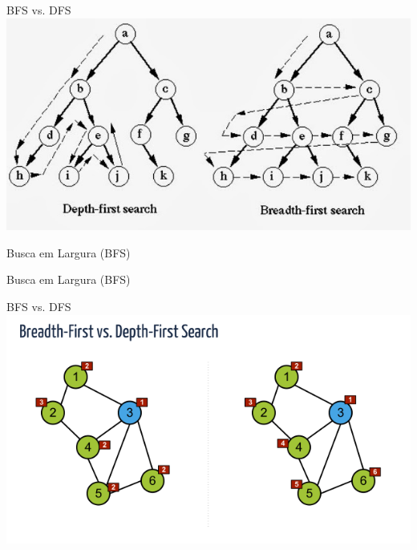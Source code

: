 \begin{frame}{BFS vs. DFS}
\includegraphics[width=\linewidth]{img/dfsbfs.jpg}
\end{frame}

\begin{frame}{Busca em Largura (BFS)}
\end{frame}

\begin{frame}{Busca em Largura (BFS)}
\end{frame}

\begin{frame}{BFS vs. DFS}
\includegraphics[width=\linewidth]{img/dfsbfs2.png}
\end{frame}

